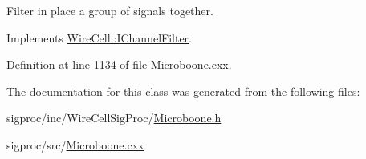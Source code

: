 Filter in place a group of signals together. 

Implements \hyperlink{class_wire_cell_1_1_i_channel_filter_a47554d77b1dca5596dc61e2221e0a137}{Wire\+Cell\+::\+I\+Channel\+Filter}.



Definition at line 1134 of file Microboone.\+cxx.



The documentation for this class was generated from the following files\+:\begin{DoxyCompactItemize}
\item 
sigproc/inc/\+Wire\+Cell\+Sig\+Proc/\hyperlink{_microboone_8h}{Microboone.\+h}\item 
sigproc/src/\hyperlink{_microboone_8cxx}{Microboone.\+cxx}\end{DoxyCompactItemize}
